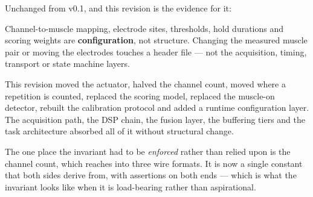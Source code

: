 \documentclass[11pt]{article}
\begin{document}
Unchanged from v0.1, and this revision is the evidence for it:

\begin{plainbox}
Channel-to-muscle mapping, electrode sites, thresholds, hold durations and
scoring weights are \textbf{configuration}, not structure. Changing the
measured muscle pair or moving the electrodes touches a header file --- not
the acquisition, timing, transport or state machine layers.
\end{plainbox}

\noindent
This revision moved the actuator, halved the channel count, moved where a
repetition is counted, replaced the scoring model, replaced the muscle-on
detector, rebuilt the calibration protocol and added a runtime configuration
layer. The acquisition path, the DSP chain, the fusion layer, the buffering
tiers and the task architecture absorbed all of it without structural change.

\medskip
\noindent
The one place the invariant had to be \emph{enforced} rather than relied upon
is the channel count, which reaches into three wire formats. It is now a
single constant that both sides derive from, with assertions on both ends ---
which is what the invariant looks like when it is load-bearing rather than
aspirational.
\end{document}
